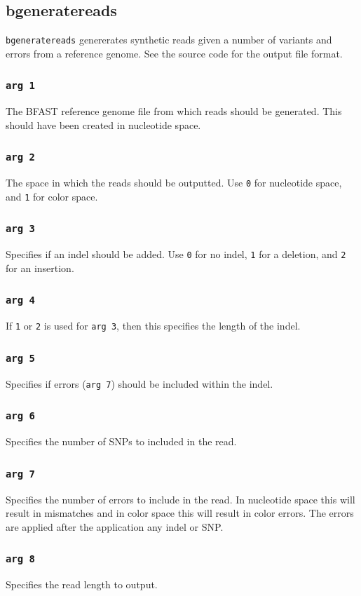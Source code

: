 \documentclass[a4paper,12pt]{book}
\newcommand{\TT}[1]{{\tt #1}} %
\newcommand{\BRGF}{BFAST reference genome file} %
\begin{document}
\subsection{bgeneratereads}
\label{sec:bgeneratereads}
\TT{bgeneratereads} genererates synthetic reads given a number of variants and errors from a reference genome.
See the source code for the output file format.

\subsubsection{\TT{arg 1}}
The \BRGF{} from which reads should be generated.
This should have been created in nucleotide space.
\subsubsection{\TT{arg 2}}
The space in which the reads should be outputted.
Use \TT{0} for nucleotide space, and \TT{1} for color space.
\subsubsection{\TT{arg 3}}
Specifies if an indel should be added.
Use \TT{0} for no indel, \TT{1} for a deletion, and \TT{2} for an insertion.
\subsubsection{\TT{arg 4}}
If \TT{1} or \TT{2} is used for \TT{arg 3}, then this specifies the length of the indel.
\subsubsection{\TT{arg 5}}
Specifies if errors (\TT{arg 7}) should be included within the indel. 
\subsubsection{\TT{arg 6}}
Specifies the number of SNPs to included in the read.
\subsubsection{\TT{arg 7}}
Specifies the number of errors to include in the read.
In nucleotide space this will result in mismatches and in color space this will result in color errors.
The errors are applied after the application any indel or SNP.
\subsubsection{\TT{arg 8}}
Specifies the read length to output.
\end{document}
